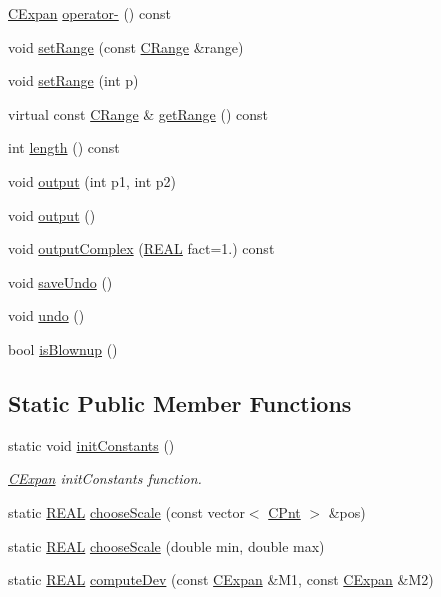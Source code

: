 \begin{DoxyCompactItemize}
\item 
\hyperlink{classCExpan}{C\-Expan} \hyperlink{classCExpan_a3dd0f73609a7ae52b9203a8aed56b481}{operator-\/} () const 
\item 
void \hyperlink{classCExpan_aa4ce064fc22518c150cabbbe15bba67f}{set\-Range} (const \hyperlink{classCRange}{C\-Range} \&range)
\item 
void \hyperlink{classCExpan_ac044e829b5ac153720826b7d29c32afd}{set\-Range} (int p)
\item 
virtual const \hyperlink{classCRange}{C\-Range} \& \hyperlink{classCExpan_a8603cbb7c8f67972e825d583711d59fd}{get\-Range} () const 
\item 
int \hyperlink{classCExpan_a3f11252425c30b1ec0e81cde708d0672}{length} () const 
\item 
void \hyperlink{classCExpan_ae1c99eafb59e32ef4bf81ab6ab355d23}{output} (int p1, int p2)
\item 
void \hyperlink{classCExpan_aa394bd74d23ce1ef31185026b82a7016}{output} ()
\item 
void \hyperlink{classCExpan_ad5f9d12cd91388ca3530732c6ce16e84}{output\-Complex} (\hyperlink{util_8h_a5821460e95a0800cf9f24c38915cbbde}{R\-E\-A\-L} fact=1.) const 
\item 
void \hyperlink{classCExpan_adc5e166d57954d68c63558750d4f3a00}{save\-Undo} ()
\item 
void \hyperlink{classCExpan_a61536819576535d2eb64f977b28134a0}{undo} ()
\item 
bool \hyperlink{classCExpan_aa3f0da342adec3dc09c9d8def24e5e0a}{is\-Blownup} ()
\end{DoxyCompactItemize}
\subsection*{Static Public Member Functions}
\begin{DoxyCompactItemize}
\item 
static void \hyperlink{classCExpan_a510850651229135cf89ff9f83a30c9d5}{init\-Constants} ()
\begin{DoxyCompactList}\small\item\em \hyperlink{classCExpan}{C\-Expan} init\-Constants function. \end{DoxyCompactList}\item 
static \hyperlink{util_8h_a5821460e95a0800cf9f24c38915cbbde}{R\-E\-A\-L} \hyperlink{classCExpan_ab048f9434fdfccf8289375a1b689393f}{choose\-Scale} (const vector$<$ \hyperlink{classCPnt}{C\-Pnt} $>$ \&pos)
\item 
static \hyperlink{util_8h_a5821460e95a0800cf9f24c38915cbbde}{R\-E\-A\-L} \hyperlink{classCExpan_a1b350268475522736c8a85065093a0ca}{choose\-Scale} (double min, double max)
\item 
static \hyperlink{util_8h_a5821460e95a0800cf9f24c38915cbbde}{R\-E\-A\-L} \hyperlink{classCExpan_a2d6598330609237ddb956f14705c264a}{compute\-Dev} (const \hyperlink{classCExpan}{C\-Expan} \&M1, const \hyperlink{classCExpan}{C\-Expan} \&M2)
\end{DoxyCompactItemize}
